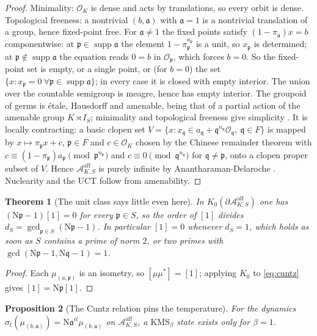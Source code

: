 \documentclass[11pt]{amsart}
\numberwithin{equation}{section}
\newtheorem{theorem}{Theorem}[section]
\newtheorem{proposition}[theorem]{Proposition}
\theoremstyle{definition}
\theoremstyle{remark}
\newcommand{\cA}{\mathcal{A}}
\newcommand{\cO}{\mathcal{O}}
\newcommand{\pp}{\mathfrak{p}}
\newcommand{\qq}{\mathfrak{q}}
\newcommand{\aaa}{\mathfrak{a}}
\newcommand{\Ns}{\mathrm{N}}
\begin{document}
\begin{proof}
Minimality: $\cO_K$ is dense and acts by translations, so every orbit is dense.
Topological freeness: a nontrivial $(b,\aaa)$ with $\aaa=1$ is a nontrivial translation of a
group, hence fixed-point free. For $\aaa\ne1$ the fixed points satisfy $(1-\pi_\aaa)x=b$
componentwise: at $\pp\in\operatorname{supp}\aaa$ the element $1-\pi_\pp^{a_\pp}$ is a unit,
so $x_\pp$ is determined; at $\pp\notin\operatorname{supp}\aaa$ the equation reads $0=b$ in
$\cO_\pp$, which forces $b=0$. So the fixed-point set is empty, or a single point, or (for
$b=0$) the set $\{x:x_\pp=0\ \forall\pp\in\operatorname{supp}\aaa\}$; in every case it is closed
with empty interior. The union over the countable semigroup is meagre, hence has empty
interior. The groupoid of germs is \'etale, Hausdorff and amenable, being that of a partial
action of the amenable group $K\rtimes I_S$; minimality and topological freeness give
simplicity \cite{BCFS}. It is locally contracting: a basic clopen set
$V=\{x:x_\qq\in a_\qq+\qq^{n_\qq}\cO_\qq,\ \qq\in F\}$ is mapped by $x\mapsto\pi_\pp x+c$,
$\pp\in F$ and $c\in\cO_K$ chosen by the Chinese remainder theorem with
$c\equiv(1-\pi_\pp)a_\pp\pmod{\pp^{n_\pp}}$ and $c\equiv0\pmod{\qq^{n_\qq}}$ for $\qq\ne\pp$,
onto a clopen proper subset of $V$. Hence $\cA^{\mathrm{aff}}_{K,S}$ is purely infinite by
Anantharaman-Delaroche \cite{AD}. Nuclearity and the UCT follow from amenability.
\end{proof}

\begin{theorem}[The unit class says little even here]\label{thm:unit}
In $K_0(\partial\cA^{\mathrm{aff}}_{K,S})$ one has $(\Ns\pp-1)[1]=0$ for every $\pp\in S$,
so the order of $[1]$ divides $d_S=\gcd_{\pp\in S}(\Ns\pp-1)$. In particular $[1]=0$ whenever
$d_S=1$, which holds as soon as $S$ contains a prime of norm $2$, or two primes with
$\gcd(\Ns\pp-1,\Ns\qq-1)=1$.
\end{theorem}

\begin{proof}
Each $\mu_{(a,\pp)}$ is an isometry, so $[\mu\mu^*]=[1]$; applying $K_0$ to \eqref{eq:cuntz}
gives $[1]=\Ns\pp[1]$.
\end{proof}

\begin{proposition}[The Cuntz relation pins the temperature]\label{prop:betaone}
For the dynamics $\sigma_t(\mu_{(b,\aaa)})=\Ns\aaa^{it}\mu_{(b,\aaa)}$ on
$\cA^{\mathrm{aff}}_{K,S}$, a $\mathrm{KMS}_\beta$ state exists only for $\beta=1$.
\end{proposition}
\end{document}
